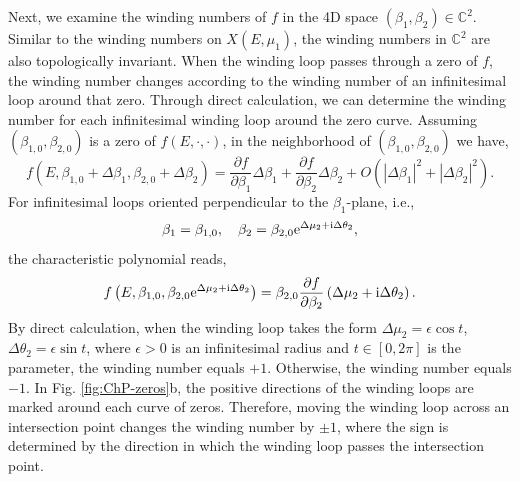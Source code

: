 \documentclass[pdflatex,sn-nature, iicol]{sn-jnl}%
\theoremstyle{thmstyleone}%
\theoremstyle{thmstyletwo}%
\theoremstyle{thmstylethree}%
\begin{document}
Next, we examine the winding numbers of $f$ in the 4D space $(\beta_{1},\beta_{2})\in\mathbb{C}^{2}$.
Similar to the winding numbers on $X(E,\mu_{1})$, the winding numbers
in $\mathbb{C}^{2}$ are also topologically invariant. When the winding
loop passes through a zero of $f$, the winding number changes according
to the winding number of an infinitesimal loop around that zero. Through
direct calculation, we can determine the winding number for each infinitesimal
winding loop around the zero curve. Assuming $(\beta_{1,0},\beta_{2,0})$
is a zero of $f(E,\cdot,\cdot)$, in the neighborhood of $(\beta_{1,0},\beta_{2,0})$
we have, 
\begin{equation}
f\left(E,\beta_{1,0}+\Delta\beta_{1},\beta_{2,0}+\Delta\beta_{2}\right)=\frac{\partial f}{\partial\beta_{1}}\Delta\beta_{1}+\frac{\partial f}{\partial\beta_{2}}\Delta\beta_{2}+O\left(|\Delta\beta_{1}|^{2}+|\Delta\beta_{2}|^{2}\right).
\end{equation}
For infinitesimal loops oriented perpendicular to the $\beta_{1}$-plane,
i.e., 
\begin{equation}
\beta_{1}=\beta_{1,0},\quad\beta_{2}=\beta_{2,0}\mathrm{e}^{\Delta\mu_{2}+\mathrm{i}\Delta\theta_{2}},
\end{equation}
the characteristic polynomial reads, 
\begin{equation}
f\left(E,\beta_{1,0},\beta_{2,0}\mathrm{e}^{\Delta\mu_{2}+\mathrm{i}\Delta\theta_{2}}\right)=\beta_{2,0}\frac{\partial f}{\partial\beta_{2}}\left(\Delta\mu_{2}+\mathrm{i}\Delta\theta_{2}\right).
\end{equation}
By direct calculation, when the winding loop takes the form $\Delta\mu_{2}=\epsilon\cos t$,
$\Delta\theta_{2}=\epsilon\sin t$, where $\epsilon>0$ is an infinitesimal
radius and $t\in[0,2\pi]$ is the parameter, the winding number equals
$+1$. Otherwise, the winding number equals $-1$. In Fig. \ref{fig:ChP-zeros}b,
the positive directions of the winding loops are marked around each
curve of zeros. Therefore, moving the winding loop across an intersection
point changes the winding number by $\pm1$, where the sign is determined
by the direction in which the winding loop passes the intersection
point.
\end{document}
